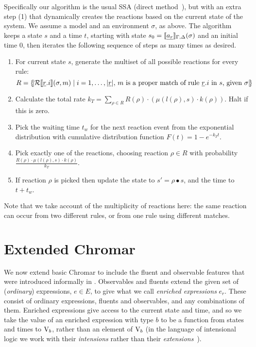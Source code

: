 Specifically our algorithm is the usual SSA (direct
method~\cite{gillespie1977exact}), but with an extra step (1) that dynamically
creates the reactions based on the current state of the system. We assume a
model and an environment $\sigma$, as above. The algorithm keeps a state $s$ and a
time $t$, starting with state $s_0 = \llbracket \underline{a_r} \rrbracket_{\Gamma,\Delta}(\sigma)$ and an initial time
$0$, then iterates the following sequence of steps as many times as desired.
\begin{enumerate}
\item For current state $s$, generate the multiset of all possible reactions for
  every rule:
$$R  = \{\!|  \mathcal{R}\llbracket \underline{r}.i \rrbracket(\sigma, m) \; | \; i = 1,\ldots, |\underline{r}|, \, m \mbox{ is a proper match of rule $\underline{r}.i$ in $s$, given $\sigma$} |\!\}$$ 
\item Calculate the total rate
  $k_T = \sum_{\rho \in R} R(\rho)\cdot (\mu(l(\rho), s)\cdot k(\rho))$. Halt if this is zero.
\item Pick the waiting time $t_w$ for the next reaction event from the
  exponential distribution with cumulative distribution function
  $F(t) = 1- e^{-k_T t}$.
\item Pick exactly one of the reactions, choosing reaction $\rho \in R$ with
  probability $\frac{R(\rho)\cdot \mu(l(\rho), s) \cdot k(\rho)}{k_T}$.
\item If reaction $\rho$ is picked then update the state to
  $s' = \rho \bullet s$, and the time to $t + t_w$.
\end{enumerate}

Note that we take account of the multiplicity of reactions here: the same
reaction can occur from two different rules, or from one rule using different
matches.

\section{Extended Chromar} 
\label{sec:extChromar} 
We now extend basic Chromar to include the fluent and observable features that
were introduced informally in . Observables and
fluents extend the given set of (\emph{ordinary}) expressions, $e \in E$, to give
what we call \emph{enriched expressions} $e_r$. These consist of ordinary
expressions, fluents and observables, and any combinations of them. Enriched
expressions give access to the current state and time, and so we take the value
of an enriched expression with type $b$ to be a function from states and times
to $\mathrm{V}_b$, rather than an element of $\mathrm{V}_b$ (in the language of intensional
logic we work with their \emph{intensions} rather than their
\emph{extensions}~\cite{Stan,Fit}).

